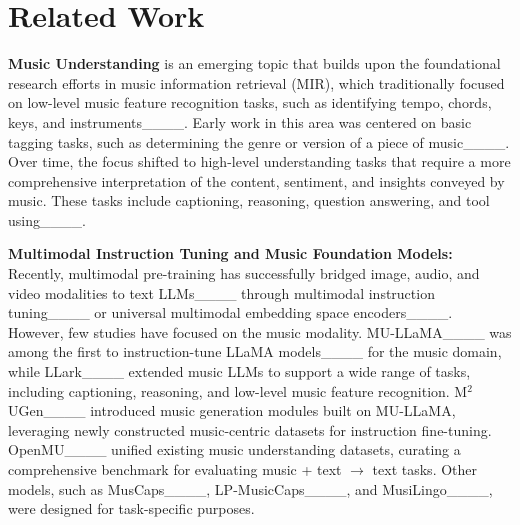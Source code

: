 \section{Related Work}
\noindent \textbf{Music Understanding}
is an emerging topic that builds upon the foundational research efforts in music information retrieval (MIR), which traditionally focused on low-level music feature recognition tasks, such as identifying tempo, chords, keys, and instruments____. Early work in this area was centered on basic tagging tasks, such as determining the genre or version of a piece of music____. Over time, the focus shifted to high-level understanding tasks that require a more comprehensive interpretation of the content, sentiment, and insights conveyed by music. These tasks include captioning, reasoning, question answering, and tool using____.


\noindent \textbf{Multimodal Instruction Tuning and Music Foundation Models:}
Recently, multimodal pre-training has successfully bridged image, audio, and video modalities to text LLMs____ through multimodal instruction tuning____ or universal multimodal embedding space encoders____. However, few studies have focused on the music modality. MU-LLaMA____ was among the first to instruction-tune LLaMA models____ for the music domain, while LLark____ extended music LLMs to support a wide range of tasks, including captioning, reasoning, and low-level music feature recognition. M$^2$UGen____ introduced music generation modules built on MU-LLaMA, leveraging newly constructed music-centric datasets for instruction fine-tuning. OpenMU____ unified existing music understanding datasets, curating a comprehensive benchmark for evaluating music + text $\xrightarrow{}$ text tasks. Other models, such as MusCaps____, LP-MusicCaps____, and MusiLingo____, were designed for task-specific purposes.

